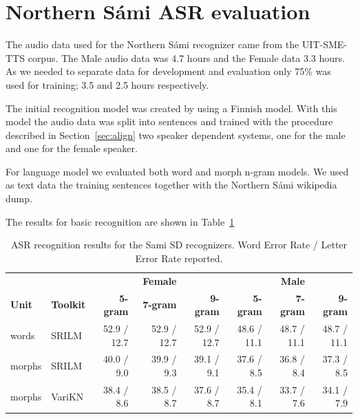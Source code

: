 \documentclass[b5paper]{article}
\newcommand{\ns}{{Northern Sámi }}
\begin{document}



%
%





\section{\ns ASR evaluation} 
\label{sec:samiexp}
The audio data used for the \ns recognizer came from the UIT-SME-TTS corpus. The Male audio data was 4.7 hours and the Female data 3.3 hours. As we needed to separate data for development and evaluation only 75\% was used for training; 3.5 and 2.5 hours respectively.

The initial recognition model was created by using a Finnish model. With this model the audio data was split into sentences and trained with the procedure described in Section~\ref{sec:align} two speaker dependent systems, one for the male and one for the female speaker. 

For language model we evaluated both word and morph n-gram models. We used as text data the training sentences together with the \ns wikipedia dump.

The results for basic recognition are shown in Table~\ref{tbl:samibasic}

\begin{table}[!h]
\centering
\begin{tabular}{ll|rrr|rrr}
& & & \textbf{Female} & & & \textbf{Male} & \\
 \textbf{Unit} & \textbf{Toolkit} & \textbf{5-gram} & \textbf{7-gram} & \textbf{9-gram} & \textbf{5-gram} & \textbf{7-gram} & \textbf{9-gram}\\\hline
 words & SRILM & 52.9 / 12.7 & 52.9 / 12.7& 52.9 / 12.7&48.6 / 11.1 & 48.7 / 11.1 & 48.7 / 11.1\\
morphs & SRILM & 40.0 /  9.0 & 39.9 / 9.3& 39.1 / 9.1 & 37.6 / 8.5 & 36.8 / 8.4 & 37.3 / 8.5 \\
 morphs & VariKN  & 38.4 / 8.6& 38.5 / 8.7  & 37.6 / 8.7 & 35.4 / 8.1 &  33.7 / 7.6 & 34.1 / 7.9 \\

\end{tabular}
\caption{ASR recognition results for the Sami SD recognizers. Word Error Rate / Letter Error Rate reported.\label{tbl:samibasic}}
\end{table}
\end{document}
